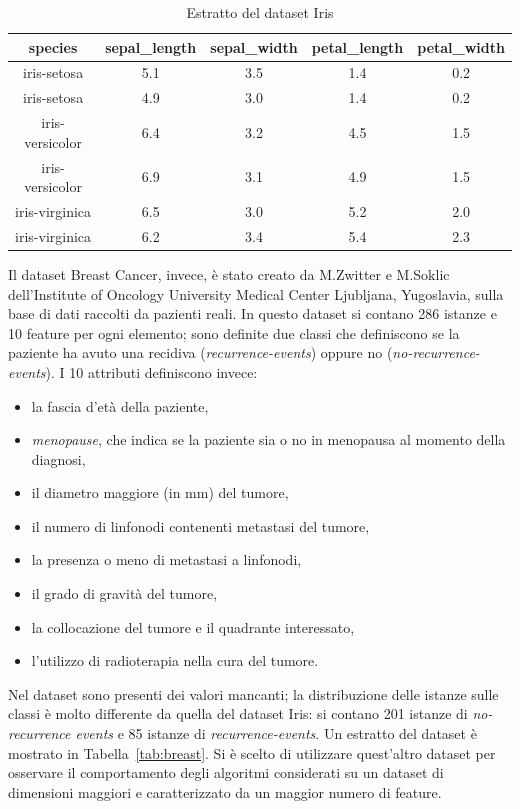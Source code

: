\documentclass[oneside, openany]{book}
\begin{document}
	\begin{table}[h]
		\caption{Estratto del dataset Iris}
		\begin{center}
			\begin{tabular}{|c|c|c|c|c|}
					\hline
					species &  sepal\_length &  sepal\_width &  petal\_length &  petal\_width \\
					\hline
					iris-setosa &           5.1 &          3.5 &           1.4 &          0.2 \\
					iris-setosa &           4.9 &          3.0 &           1.4 &          0.2 \\
					iris-versicolor &           6.4 &		3.2 &			4.5 &			1.5 \\
					iris-versicolor &           6.9 &          3.1 &        4.9 &          1.5 \\
					iris-virginica &           6.5 &          3.0 &           5.2 &          2.0 \\
					iris-virginica &           6.2 &          3.4 &           5.4 &          2.3 \\
					\hline
			\end{tabular}
		\end{center}
		\label{tab:iris}
	\end{table}

	Il dataset Breast Cancer, invece, è stato creato da M.Zwitter e M.Soklic dell'Institute of Oncology University Medical Center Ljubljana, Yugoslavia, sulla base di dati raccolti da pazienti reali. In questo dataset si contano 286 istanze e 10 feature per ogni elemento; sono definite due classi che definiscono se la paziente ha avuto una recidiva (\textit{recurrence-events}) oppure no (\textit{no-recurrence-events}). I 10 attributi definiscono invece:
	\begin{itemize}
		\item{la fascia d'età della paziente,}
		\item{\textit{menopause}, che indica se la paziente sia o no in menopausa al momento della diagnosi,}
		\item{il diametro maggiore (in mm) del tumore,}
		\item{il numero di linfonodi contenenti metastasi del tumore,}
		\item{la presenza o meno di metastasi a linfonodi,}
		\item{il grado di gravità del tumore,}
		\item{la collocazione del tumore e il quadrante interessato,}
		\item{l'utilizzo di radioterapia nella cura del tumore.}
	\end{itemize}	
	Nel dataset sono presenti dei valori mancanti; la distribuzione delle istanze sulle classi è molto differente da quella del dataset Iris: si contano 201 istanze di \textit{no-recurrence events} e 85 istanze di \textit{recurrence-events}. Un estratto del dataset è mostrato in Tabella~\ref{tab:breast}. Si è scelto di utilizzare quest'altro dataset per osservare il comportamento degli algoritmi considerati su un dataset di dimensioni maggiori e caratterizzato da un maggior numero di feature.
	
\end{document}
